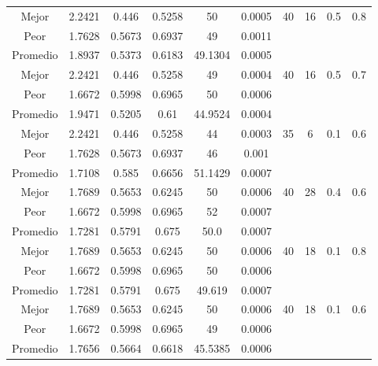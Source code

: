 \begin{table}[h!]
\begin{center}
\begin{tabular}{|c|c|c|c|c|c|c|c|c|c|}
            \cline{1-6}
            Mejor & 2.2421 & 0.446  & 0.5258 & 50 & 0.0005 & 40 & 16 & 0.5 & 0.8\\
            \cline{1-6}
            Peor & 1.7628 & 0.5673  & 0.6937 & 49 & 0.0011 &  &  &  & \\
        \hline
        \hline
            Promedio  & 1.8937 & 0.5373 & 0.6183 & 49.1304 & 0.0005 &  &  &  & \\
            \cline{1-6}
            Mejor & 2.2421 & 0.446  & 0.5258 & 49 & 0.0004 & 40 & 16 & 0.5 & 0.7\\
            \cline{1-6}
            Peor & 1.6672 & 0.5998  & 0.6965 & 50 & 0.0006 &  &  &  & \\
        \hline
        \hline
            Promedio  & 1.9471 & 0.5205 & 0.61 & 44.9524 & 0.0004 &  &  &  & \\
            \cline{1-6}
            Mejor & 2.2421 & 0.446  & 0.5258 & 44 & 0.0003 & 35 & 6 & 0.1 & 0.6\\
            \cline{1-6}
            Peor & 1.7628 & 0.5673  & 0.6937 & 46 & 0.001 &  &  &  & \\
        \hline
        \hline
            Promedio  & 1.7108 & 0.585 & 0.6656 & 51.1429 & 0.0007 &  &  &  & \\
            \cline{1-6}
            Mejor & 1.7689 & 0.5653  & 0.6245 & 50 & 0.0006 & 40 & 28 & 0.4 & 0.6\\
            \cline{1-6}
            Peor & 1.6672 & 0.5998  & 0.6965 & 52 & 0.0007 &  &  &  & \\
        \hline
        \hline
            Promedio  & 1.7281 & 0.5791 & 0.675 & 50.0 & 0.0007 &  &  &  & \\
            \cline{1-6}
            Mejor & 1.7689 & 0.5653  & 0.6245 & 50 & 0.0006 & 40 & 18 & 0.1 & 0.8\\
            \cline{1-6}
            Peor & 1.6672 & 0.5998  & 0.6965 & 50 & 0.0006 &  &  &  & \\
        \hline
        \hline
            Promedio  & 1.7281 & 0.5791 & 0.675 & 49.619 & 0.0007 &  &  &  & \\
            \cline{1-6}
            Mejor & 1.7689 & 0.5653  & 0.6245 & 50 & 0.0006 & 40 & 18 & 0.1 & 0.6\\
            \cline{1-6}
            Peor & 1.6672 & 0.5998  & 0.6965 & 49 & 0.0006 &  &  &  & \\
        \hline
        \hline
            Promedio  & 1.7656 & 0.5664 & 0.6618 & 45.5385 & 0.0006 &  &  &  & \\

\end{tabular}
\end{center}
\end{table}
